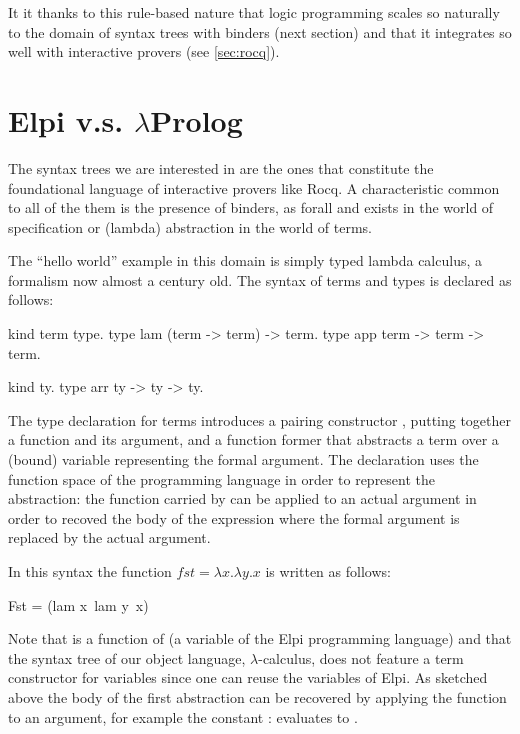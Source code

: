 \documentclass[a4paper, 11pt]{book}
\begin{document}
It it thanks to this rule-based nature that logic programming scales so
naturally to the domain of syntax trees with binders (next section)
and that it integrates so well with interactive provers (see \cref{sec:rocq}).

\section{Elpi v.s. $\lambda$Prolog}\label{sec:hello}

The syntax trees we are interested in are the ones that constitute
the foundational language of interactive provers like Rocq. A characteristic common
to all of the them is the presence of binders, as forall and exists in
the world of specification or (lambda) abstraction in the world of terms.

The ``hello world'' example in this domain is simply typed lambda calculus,
a formalism now almost a century old. The syntax of terms and types
is declared as follows:

\begin{elpicode}
kind term type.
type lam (term -> term) -> term.
type app term -> term -> term.

kind ty.
type arr ty -> ty -> ty.
\end{elpicode}

The type declaration for terms introduces a pairing constructor ,
putting together a function and its argument, and a function former
 that abstracts a term over a (bound) variable representing the
formal argument. The declaration uses the function space of
the programming language in order to represent the abstraction:
the function carried by  can be applied to an actual argument in order
to recoved the body of the expression where the formal argument is
replaced by the actual argument.

In this syntax the function $fst = \lambda x.\lambda y.x$ is written as follows:

\begin{elpicode}
Fst = (lam x\ lam y\ x)
\end{elpicode}

Note that  is a function of  (a
variable of the Elpi programming language)
and that the syntax tree of our object language, $\lambda$-calculus, does not
feature a term constructor for variables since one can reuse the variables
of Elpi.
As sketched above the body of the first abstraction
can be recovered by applying the function to an argument, for
example the constant : 
evaluates to .
\end{document}
